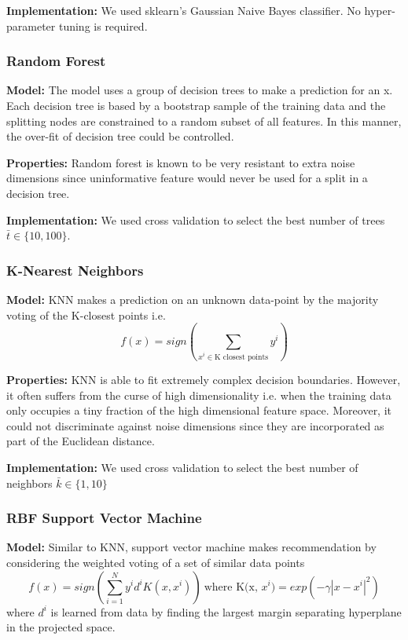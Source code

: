 \documentclass{article}
\begin{document}
\textbf{Implementation:}
We used sklearn's Gaussian Naive Bayes classifier. No hyper-parameter tuning is required.

\subsubsection*{Random Forest}
\textbf{Model:}
The model uses a group of decision trees to make a prediction for an x. Each decision tree is based by a bootstrap sample of the training data and the splitting nodes are constrained to a random subset of all features. In this manner, the over-fit of decision tree could be controlled.

\textbf{Properties:}
Random forest is known to be very resistant to extra noise dimensions since uninformative feature would never be used for a split in a decision tree.

\textbf{Implementation:}
We used cross validation to select the best number of trees $\bar{t} \in \{10, 100\}$.

\subsubsection*{K-Nearest Neighbors}
\textbf{Model:}
KNN makes a prediction on an unknown data-point by the majority voting of the K-closest points i.e. $$f(x) = sign(\sum_{x^i \in \text{K closest points}} y^i) $$

\textbf{Properties:}
KNN is able to fit extremely complex decision boundaries. However, it often suffers from the curse of high dimensionality i.e. when the training data only occupies a tiny fraction of the high dimensional feature space. Moreover, it could not discriminate against noise dimensions since they are incorporated as part of the Euclidean distance.

\textbf{Implementation:}
We used cross validation to select the best number of neighbors $\bar{k} \in \{1, 10\}$




\subsubsection*{RBF Support Vector Machine}
\textbf{Model:}
Similar to KNN, support vector machine makes recommendation by considering the weighted voting of a set of similar data points
$$f(x) = sign(\sum_{i=1}^{N} y^i d^i K(x, x^i))\ \text{where K(x, $x^i$)} = exp(-\gamma|x - x^i|^2)$$
where $d^i$ is learned from data by finding the largest margin separating hyperplane in the projected space.
\end{document}

